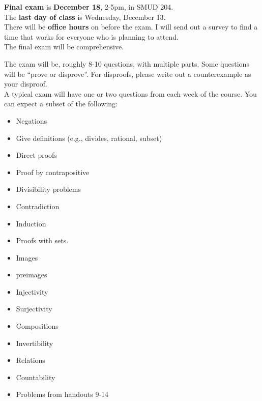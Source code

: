 \documentclass[12pt]{article}
\begin{document}
\textbf{Final exam} is \textbf{December 18}, 2-5pm, in SMUD 204.
\\

\noindent The \textbf{last day of class} is Wednesday, December 13. 
\\

\noindent There will be \textbf{office hours} on before the exam. I will send out a survey to find a time that works for everyone who is planning to attend.%
\\

The final exam will be comprehensive.%


The exam will be, roughly 8-10 questions, with multiple parts. Some questions will be ``prove or disprove''. For disproofs, please write out a counterexample as your disproof.
\\

A typical exam will have one or two questions from each week of the course. You can expect a subset of the following:
\begin{itemize}
\item Negations
\item Give definitions (e.g., divides, rational, subset)
\item Direct proofs
\item Proof by contrapositive
\item Divisibility problems
\item Contradiction
\item Induction
\item Proofs with sets. 
\item Images
\item preimages
\item Injectivity 
\item Surjectivity
\item Compositions
\item Invertibility
\item Relations
\item Countability
\item Problems from handouts 9-14
\end{itemize}




 
\end{document}
